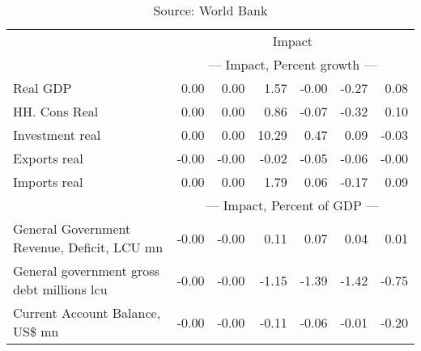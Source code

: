 \documentclass{article}
\begin{document}
\begin{table}[ht]
\begin{tabular}{lrrrrr|r}
&\multicolumn{6}{c}{{Impact}}                               \\
&\multicolumn{6}{c}{{--- Impact, Percent growth ---}}                               \\
Real GDP & 0.00 & 0.00 & 1.57 & -0.00 & -0.27 & 0.08 \\
HH. Cons Real & 0.00 & 0.00 & 0.86 & -0.07 & -0.32 & 0.10 \\
Investment real & 0.00 & 0.00 & 10.29 & 0.47 & 0.09 & -0.03 \\
Exports real & -0.00 & -0.00 & -0.02 & -0.05 & -0.06 & -0.00 \\
Imports real & 0.00 & 0.00 & 1.79 & 0.06 & -0.17 & 0.09 \\
&\multicolumn{6}{c}{{--- Impact, Percent of GDP ---}}                               \\
General Government Revenue, Deficit, LCU mn & -0.00 & -0.00 & 0.11 & 0.07 & 0.04 & 0.01 \\
General government gross debt millions lcu & -0.00 & -0.00 & -1.15 & -1.39 & -1.42 & -0.75 \\
Current Account Balance, US\$ mn & -0.00 & -0.00 & -0.11 & -0.06 & -0.01 & -0.20 \\
\bottomrule
\end{tabular}
\caption*{Source: World Bank}
\end{table}
\end{document}
